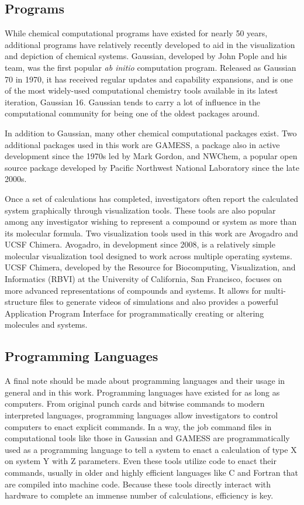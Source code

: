 \subsection{Programs}

While chemical computational programs have existed for nearly 50 years, additional programs have relatively recently developed to aid in the visualization and depiction of chemical systems.
Gaussian, developed by John Pople and his team, was the first popular \textit{ab initio} computation program.
Released as Gaussian 70 in 1970, it has received regular updates and capability expansions, and is one of the most widely-used computational chemistry tools available in its latest iteration, Gaussian 16.
Gaussian tends to carry a lot of influence in the computational community for being one of the oldest packages around.

In addition to Gaussian, many other chemical computational packages exist.
Two additional packages used in this work are GAMESS,\cite{GAMESS} a package also in active development since the 1970s led by Mark Gordon, and NWChem,\cite{NWChem} a popular open source package developed by Pacific Northwest National Laboratory since the late 2000s.

Once a set of calculations has completed, investigators often report the calculated system graphically through visualization tools.
These tools are also popular among any investigator wishing to represent a compound or system as more than its molecular formula.
Two visualization tools used in this work are Avogadro and UCSF Chimera.
Avogadro, in development since 2008, is a relatively simple molecular visualization tool designed to work across multiple operating systems.\cite{Avogadro}
UCSF Chimera, developed by the Resource for Biocomputing, Visualization, and Informatics (RBVI) at the University of California, San Francisco, focuses on more advanced representations of compounds and systems. It allows for multi-structure files to generate videos of simulations and also provides a powerful Application Program Interface for programmatically creating or altering molecules and systems.\cite{UCSFChimera}

\subsection{Programming Languages}

A final note should be made about programming languages and their usage in general and in this work.
Programming languages have existed for as long as computers.
From original punch cards and bitwise commands to modern interpreted languages, programming languages allow investigators to control computers to enact explicit commands.
In a way, the job command files in computational tools like those in Gaussian and GAMESS are programmatically used as a programming language to tell a system to enact a calculation of type X on system Y with Z parameters.
Even these tools utilize code to enact their commands, usually in older and highly efficient languages like C and Fortran that are compiled into machine code.
Because these tools directly interact with hardware to complete an immense number of calculations, efficiency is key.


